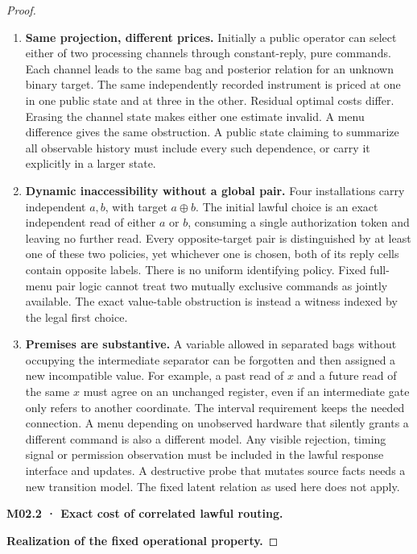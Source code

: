 \begin{proof}
\begin{enumerate}
\item
  \textbf{Same projection, different prices.} Initially a public operator can select either of two processing channels through constant-reply, pure commands. Each channel leads to the same bag and posterior relation for an unknown binary target. The same independently recorded instrument is priced at one in one public state and at three in the other. Residual optimal costs differ. Erasing the channel state makes either one estimate invalid. A menu difference gives the same obstruction. A public state claiming to summarize all observable history must include every such dependence, or carry it explicitly in a larger state.
\item
  \textbf{Dynamic inaccessibility without a global pair.} Four installations carry independent \(a,b\), with target \(a\oplus b\). The initial lawful choice is an exact independent read of either \(a\) or \(b\), consuming a single authorization token and leaving no further read. Every opposite-target pair is distinguished by at least one of these two policies, yet whichever one is chosen, both of its reply cells contain opposite labels. There is no uniform identifying policy. Fixed full-menu pair logic cannot treat two mutually exclusive commands as jointly available. The exact value-table obstruction is instead a witness indexed by the legal first choice.
\item
  \textbf{Premises are substantive.} A variable allowed in separated bags without occupying the intermediate separator can be forgotten and then assigned a new incompatible value. For example, a past read of \(x\) and a future read of the same \(x\) must agree on an unchanged register, even if an intermediate gate only refers to another coordinate. The interval requirement keeps the needed connection. A menu depending on unobserved hardware that silently grants a different command is also a different model. Any visible rejection, timing signal or permission observation must be included in the lawful response interface and updates. A destructive probe that mutates source facts needs a new transition model. The fixed latent relation as used here does not apply.
\end{enumerate}

\textbf{M02.2 · Exact cost of correlated lawful routing.}

\textbf{Realization of the fixed operational property.}


\end{proof}
